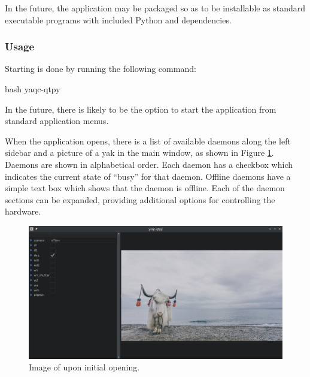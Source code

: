 In the future, the application may be packaged so as to be installable as standard executable programs with included Python and dependencies.

\subsubsection{Usage}

Starting \yaqcqtpy{} is done by running the following command:

\begin{codefragment}{bash}
yaqc-qtpy
\end{codefragment}

In the future, there is likely to be the option to start the application from standard application menus.

When the application opens, there is a list of available daemons along the left sidebar and a picture of a yak in the main window, as shown in Figure \ref{yaq:fig:yaqc_qtpy_startup}.
Daemons are shown in alphabetical order.
Each daemon has a checkbox which indicates the current state of ``busy'' for that daemon.
Offline daemons have a simple text box which shows that the daemon is offline.
Each of the daemon sections can be expanded, providing additional options for controlling the hardware.

\begin{landscape}
\begin{figure}
\includegraphics[width=9in]{"yaq/images/yaqc_qtpy_startup"}
\caption[\yaqcqtpy{} Startup]{
	Image of \yaqcqtpy{} upon initial opening.
}
\label{yaq:fig:yaqc_qtpy_startup}
\end{figure}
\end{landscape}


